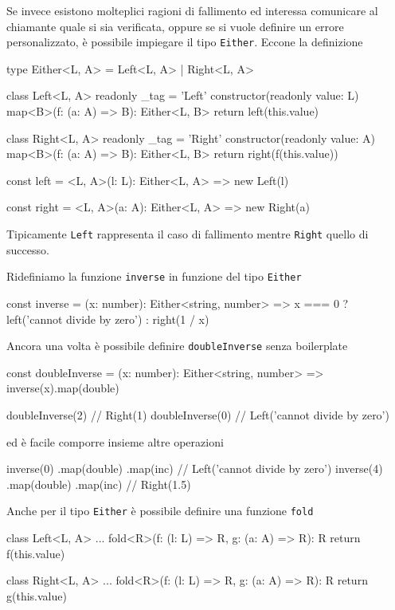 \documentclass[12pt]{article}
\theoremstyle{definition}
\newenvironment{code}
  {\vspace{0.5cm} \VerbatimEnvironment\begin{typescriptcode}}
  {\end{typescriptcode} \vspace{0.2cm}}
\begin{document}
Se invece esistono molteplici ragioni di fallimento ed interessa comunicare al chiamante quale si sia verificata,
oppure se si vuole definire un errore personalizzato, è possibile impiegare il tipo \texttt{Either}. Eccone la definizione

\begin{code}
type Either<L, A> = Left<L, A> | Right<L, A>

class Left<L, A> {
  readonly _tag = 'Left'
  constructor(readonly value: L) {}
  map<B>(f: (a: A) => B): Either<L, B> {
    return left(this.value)
  }
}

class Right<L, A> {
  readonly _tag = 'Right'
  constructor(readonly value: A) {}
  map<B>(f: (a: A) => B): Either<L, B> {
    return right(f(this.value))
  }
}

const left = <L, A>(l: L): Either<L, A> =>
  new Left(l)

const right = <L, A>(a: A): Either<L, A> =>
  new Right(a)
\end{code}

Tipicamente \texttt{Left} rappresenta il caso di fallimento mentre \texttt{Right} quello di successo.

Ridefiniamo la funzione \texttt{inverse} in funzione del tipo \texttt{Either}

\begin{code}
const inverse = (x: number): Either<string, number> =>
  x === 0 ? left('cannot divide by zero') : right(1 / x)
\end{code}

Ancora una volta è possibile definire \texttt{doubleInverse} senza boilerplate

\begin{code}
const doubleInverse = (x: number): Either<string, number> =>
  inverse(x).map(double)

doubleInverse(2) // Right(1)
doubleInverse(0) // Left('cannot divide by zero')
\end{code}

ed è facile comporre insieme altre operazioni

\begin{code}
inverse(0)
  .map(double)
  .map(inc) // Left('cannot divide by zero')
inverse(4)
  .map(double)
  .map(inc) // Right(1.5)
\end{code}

Anche per il tipo \texttt{Either} è possibile definire una funzione \texttt{fold}

\begin{code}
class Left<L, A> {
  ...
  fold<R>(f: (l: L) => R, g: (a: A) => R): R {
    return f(this.value)
  }
}

class Right<L, A> {
  ...
  fold<R>(f: (l: L) => R, g: (a: A) => R): R {
    return g(this.value)
  }
}
\end{code}
\end{document}
